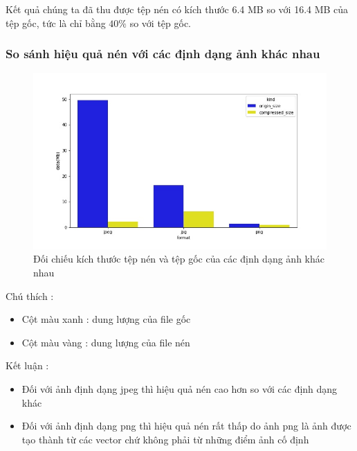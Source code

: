 Kết quả chúng ta đã thu được tệp nén có kích thước 6.4 MB so với 16.4 MB của tệp gốc, tức là chỉ bằng $40\%$ so với tệp gốc.
\newpage
\subsubsection{So sánh hiệu quả nén với các định dạng ảnh khác nhau}
\begin{center}
    \begin{figure}[htp]
        \begin{center}
            \includegraphics[width=\textwidth,height=\textheight,keepaspectratio]{Chapters/content/27_pca/barplot.jpg}
        \end{center}
        \caption{Đối chiếu kích thước tệp nén và tệp gốc của các định dạng ảnh khác nhau}
        \label{fig:27_11}
    \end{figure}
\end{center}

Chú thích :
\begin{itemize}
    \item Cột màu xanh : dung lượng của file gốc
    \item Cột màu vàng : dung lượng của file nén
\end{itemize}

Kết luận :
\begin{itemize}
    \item Đối với ảnh định dạng jpeg thì hiệu quả nén cao hơn so với các định dạng khác
    \item Đối với ảnh định dạng png thì hiệu quả nén rất thấp do ảnh png là ảnh được tạo thành từ các vector chứ không phải từ những điểm ảnh cố định
\end{itemize}


% 
% 



